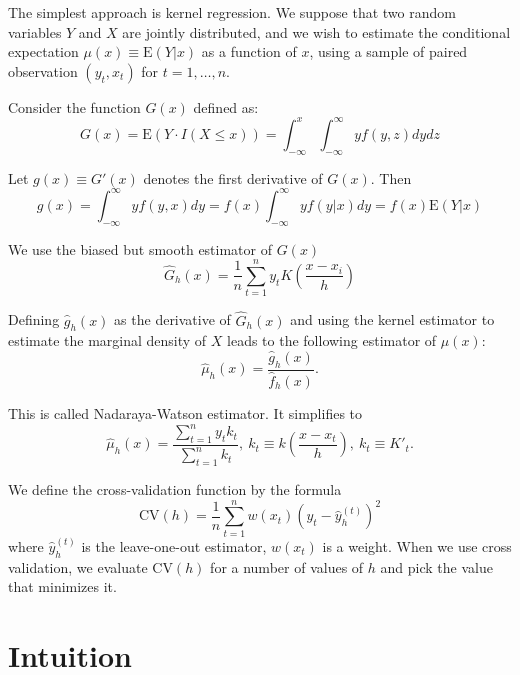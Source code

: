 The simplest approach is kernel regression.  We suppose that two
random variables $Y$ and $X$ are jointly distributed, and we wish to
estimate the conditional expectation $\mu (x) \equiv \mbox{E} (Y|x)$
as a function of $x$, using a sample of paired observation $(y_t,
x_t)$ for $t=1, \dots, n$.

Consider the function $G(x)$ defined as:
\begin{equation}
G(x)=\mbox{E} (Y \cdot I(X \le x))= \int^x_{- \infty}
\int^{\infty}_{-\infty} y f(y,z) dy dz
\end{equation}

Let $g(x) \equiv G'(x)$ denotes the first derivative of $G(x)$.
Then
\begin{equation}
g(x)= \int^{\infty}_{-\infty} y f(y,x) dy =f(x)
\int^{\infty}_{-\infty} y f(y|x) dy =f(x) \mbox{E} (Y|x)
\end{equation}

We use the biased but smooth estimator of $G(x)$
\begin{equation}
\hat G_h(x)=\frac{1}{n} \sum_{t=1}^n y_t K(\frac{x-x_i}{h})
\end{equation}

Defining $\hat g_h(x)$ as the derivative of $\hat G_h(x)$ and
using the kernel estimator to estimate the marginal density of $X$
leads to the following estimator of $\mu (x)$:
\begin{equation}
\hat \mu_h(x)=\frac{\hat g_h(x)}{\hat f_h(x)}.
\end{equation}

This is called Nadaraya-Watson estimator.  It simplifies to
\begin{equation}
\hat \mu_h(x)=\frac{\sum_{t=1}^{n}y_t k_t}{\sum_{t=1}^{n}k_t}, \
k_t \equiv k(\frac{x-x_t}{h}), \ k_t \equiv K'_t.
\end{equation}


We define the cross-validation function by the formula
\begin{equation}
\mbox{CV}(h)=\frac{1}{n} \sum_{t=1}^nw(x_t)(y_t-\hat y_h^{(t)})^2
\end{equation}
where $\hat y_h^{(t)}$ is the leave-one-out estimator, $w(x_t)$ is a
weight.  When we use cross validation, we evaluate $\mbox{CV}(h)$
for a number of values of $h$ and pick the value that minimizes it.

\section{Intuition}

